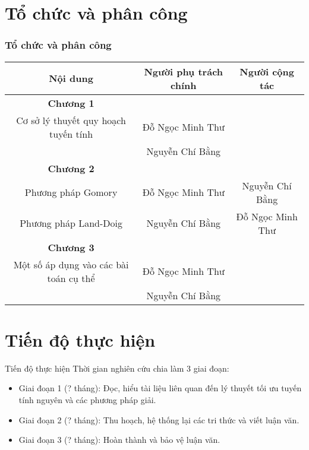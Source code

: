 \documentclass{beamer}
\begin{document}
\section{Tổ chức và phân công}
\begin{frame}[shrink=20]
    \frametitle{Tổ chức và phân công}
    \vspace{1.5cm}
    \begin{table}
        \begin{tabular}{|c|c|c|}
            \hline
            Nội dung & Người phụ trách chính & Người cộng tác \\
            \hline \hline
            \textbf{Chương 1} && \\
            \hline
            Cơ sở lý thuyết quy hoạch tuyến tính & Đỗ Ngọc Minh Thư & \\
            & Nguyễn Chí Bằng & \\
            \hline
            \textbf{Chương 2} && \\
            \hline
            Phương pháp Gomory & Đỗ Ngọc Minh Thư & Nguyễn Chí Bằng \\
            Phương pháp Land-Doig & Nguyễn Chí Bằng & Đỗ Ngọc Minh Thư \\
            \hline
            \textbf{Chương 3} && \\
            \hline
            Một số áp dụng vào các bài
            toán cụ thể & Đỗ Ngọc Minh Thư & \\
            & Nguyễn Chí Bằng & \\
            \hline
        \end{tabular}
    \end{table}
\end{frame}
\section{Tiến độ thực hiện}
\begin{frame}{Tiến độ thực hiện}
Thời gian nghiên cứu chia làm 3 giai đoạn:
\begin{itemize}
\item Giai đoạn 1 (? tháng): Đọc, hiểu tài liệu liên quan đến lý thuyết tối ưu tuyến tính nguyên và các phương pháp giải.
\item Giai đoạn 2 (? tháng): Thu hoạch, hệ thống lại các tri thức và viết luận văn.
\item Giai đoạn 3 (? tháng): Hoàn thành và bảo vệ luận văn.
\end{itemize}
\end{frame}
\end{document}
